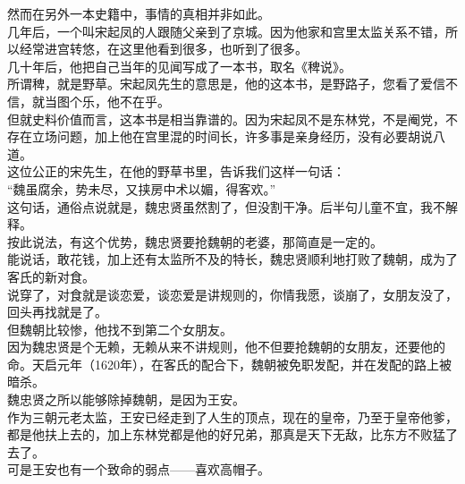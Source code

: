 \begin{multicols}{\theparacolNo}
然而在另外一本史籍中，事情的真相并非如此。\\

几年后，一个叫宋起凤的人跟随父亲到了京城。因为他家和宫里太监关系不错，所以经常进宫转悠，在这里他看到很多，也听到了很多。\\

几十年后，他把自己当年的见闻写成了一本书，取名《稗说》。\\

所谓稗，就是野草。宋起凤先生的意思是，他的这本书，是野路子，您看了爱信不信，就当图个乐，他不在乎。\\

但就史料价值而言，这本书是相当靠谱的。因为宋起凤不是东林党，不是阉党，不存在立场问题，加上他在宫里混的时间长，许多事是亲身经历，没有必要胡说八道。\\

这位公正的宋先生，在他的野草书里，告诉我们这样一句话：\\

“魏虽腐余，势未尽，又挟房中术以媚，得客欢。”\\

这句话，通俗点说就是，魏忠贤虽然割了，但没割干净。后半句儿童不宜，我不解释。\\

按此说法，有这个优势，魏忠贤要抢魏朝的老婆，那简直是一定的。\\

能说话，敢花钱，加上还有太监所不及的特长，魏忠贤顺利地打败了魏朝，成为了客氏的新对食。\\

说穿了，对食就是谈恋爱，谈恋爱是讲规则的，你情我愿，谈崩了，女朋友没了，回头再找就是了。\\

但魏朝比较惨，他找不到第二个女朋友。\\

因为魏忠贤是个无赖，无赖从来不讲规则，他不但要抢魏朝的女朋友，还要他的命。天启元年（1620年），在客氏的配合下，魏朝被免职发配，并在发配的路上被暗杀。\\

魏忠贤之所以能够除掉魏朝，是因为王安。\\

作为三朝元老太监，王安已经走到了人生的顶点，现在的皇帝，乃至于皇帝他爹，都是他扶上去的，加上东林党都是他的好兄弟，那真是天下无敌，比东方不败猛了去了。\\

可是王安也有一个致命的弱点——喜欢高帽子。\\


\end{multicols}
